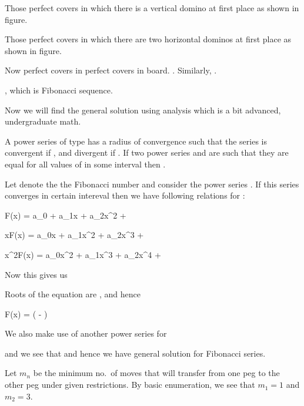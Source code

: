    Those perfect covers in which there is a vertical domino at first place as shown in figure.

   Those perfect covers in which there are two horizontal dominos at first place as shown in figure.

  Now perfect covers in  perfect covers in  board. . Similarly, .

  , which is Fibonacci sequence.

  Now we will find the general solution using analysis which is a bit advanced, undergraduate math.

  A power series of type  has a radius of convergence  such that the series is
  convergent if , and divergent if . If two power series  and  are such that they are equal for all values of  in some interval  then .

  Let  denote the the Fibonacci number and consider the power series . If this series converges in certain intereval  then
  we have following relations for :

  \startformula F(x) = a_0 + a_1x + a_2x^2 + \cdots\stopformula

  \startformula xF(x) = a_0x + a_1x^2 + a_2x^3 + \cdots\stopformula

  \startformula x^2F(x) = a_0x^2 + a_1x^3 + a_2x^4 + \cdots\stopformula

  Now this gives us 

  Roots of the equation  are , and hence

  \startformula F(x) = \left( - \right)\stopformula

  We also make use of another power series  for 

  and we see that  and hence we have general
  solution for Fibonacci series.
\item Let $m_n$ be the minimum no.\ of moves that will transfer from one peg to the other peg under given
  restrictions. By basic enumeration, we see that $m_1 = 1$ and $m_2 = 3$.

